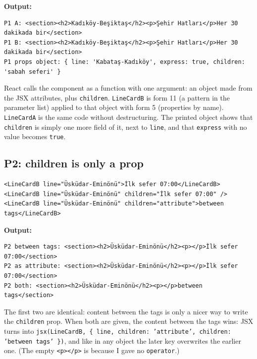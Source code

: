 \documentclass[
  10pt,
]{article}
\begin{document}
\textbf{Output:}

\begin{verbatim}
P1 A: <section><h2>Kadıköy-Beşiktaş</h2><p>Şehir Hatları</p>Her 30 dakikada bir</section>
P1 B: <section><h2>Kadıköy-Beşiktaş</h2><p>Şehir Hatları</p>Her 30 dakikada bir</section>
P1 props object: { line: 'Kabataş-Kadıköy', express: true, children: 'sabah seferi' }
\end{verbatim}

React calls the component as a function with one argument: an object
made from the JSX attributes, plus \texttt{children}. \texttt{LineCardB}
is form 11 (a pattern in the parameter list) applied to that object with
form 5 (properties by name). \texttt{LineCardA} is the same code without
destructuring. The printed object shows that \texttt{children} is simply
one more field of it, next to \texttt{line}, and that \texttt{express}
with no value becomes \texttt{true}.

\hypertarget{p2-children-is-only-a-prop}{%
\subsection{P2: children is only a
prop}\label{p2-children-is-only-a-prop}}

\begin{verbatim}
<LineCardB line="Üsküdar-Eminönü">İlk sefer 07:00</LineCardB>
<LineCardB line="Üsküdar-Eminönü" children="İlk sefer 07:00" />
<LineCardB line="Üsküdar-Eminönü" children="attribute">between tags</LineCardB>
\end{verbatim}

\textbf{Output:}

\begin{verbatim}
P2 between tags: <section><h2>Üsküdar-Eminönü</h2><p></p>İlk sefer 07:00</section>
P2 as attribute: <section><h2>Üsküdar-Eminönü</h2><p></p>İlk sefer 07:00</section>
P2 both: <section><h2>Üsküdar-Eminönü</h2><p></p>between tags</section>
\end{verbatim}

The first two are identical: content between the tags is only a nicer
way to write the \texttt{children} prop. When both are given, the
content between the tags wins: JSX turns into
\texttt{jsx(\allowbreak{}LineCardB,\allowbreak{} \{ line,\allowbreak{} children:\allowbreak{} 'attribute',\allowbreak{} children:\allowbreak{} 'between tags' \})},
and like in any object the later key overwrites the earlier one. (The
empty \texttt{<p></\allowbreak{}p>} is because I gave no
\texttt{operator}.)
\end{document}
